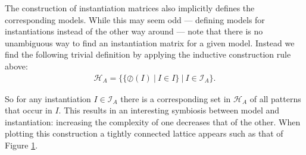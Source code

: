 \documentclass{llncs}
\begin{document}
The construction of instantiation matrices also implicitly defines the corresponding models. While this may seem odd --- defining models for instantiations instead of the other way around --- note that there is no unambiguous way to find an instantiation matrix for a given model. Instead we find the following trivial definition by applying the inductive construction rule above:
%
\begin{align*}
\mathcal{H}_A=\big\{\{\oslash({I}) \ | \ {I} \in {I} \} \ \big | \ {I} \in \mathcal{I}_A \big\}.
\end{align*}

So for any instantiation ${I}\in \mathcal{I}_A$ there is a corresponding set in $\mathcal{H}_A$ of all patterns that occur in ${I}$. This results in an interesting symbiosis between model and instantiation: increasing the complexity of one decreases that of the other. When plotting this construction a tightly connected lattice appears such as that of Figure \ref{lattice}. 

\begin{figure}

\label{lattice}
\end{figure}


\end{document}
